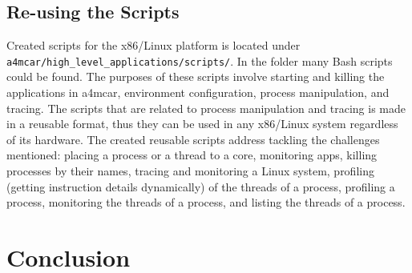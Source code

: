 \subsection{Re-using the Scripts}
Created scripts for the x86/Linux platform is located under \texttt{a4mcar/high{\_}level{\_}applications/scripts/}. In the folder many Bash scripts could be found. The purposes of these scripts involve starting and killing the applications in a4mcar, environment configuration, process manipulation, and tracing. The scripts that are related to process manipulation and tracing is made in a reusable format, thus they can be used in any x86/Linux system regardless of its hardware. The created reusable scripts address tackling the challenges mentioned: placing a process or a thread to a core, monitoring apps, killing processes by their names, tracing and monitoring a Linux system, profiling (getting instruction details dynamically) of the threads of a process, profiling a process, monitoring the threads of a process, and listing the threads of a process.

\newpage
\section{Conclusion}
\newpage
{}

